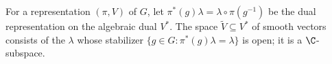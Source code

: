 For a representation $(\pi,V)$ of $G$, let $\pi^*(g)\lambda=\lambda\circ\pi(g^{-1})$ be the dual representation on the algebraic dual $V^*$. The space $\tilde V\subseteq V^*$ of smooth vectors consists of the $\lambda$ whose stabilizer $\{g\in G:\pi^*(g)\lambda=\lambda\}$ is open; it is a $\C$-subspace.
